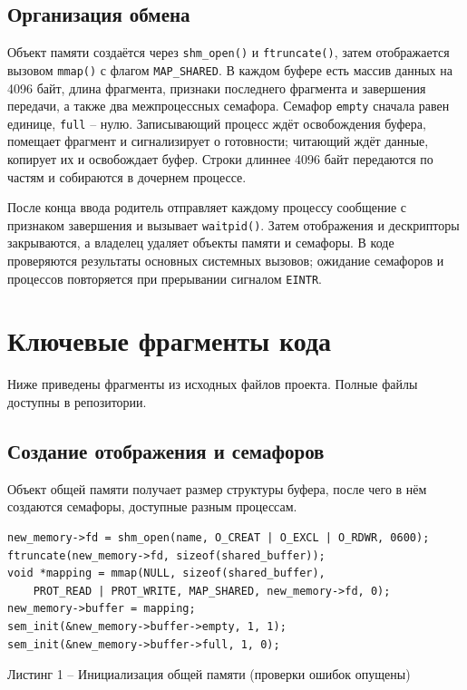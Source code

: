 \documentclass[12pt,a4paper]{article}
\begin{document}
\subsection{Организация обмена}
Объект памяти создаётся через \texttt{shm\_open()} и \texttt{ftruncate()}, затем отображается вызовом \texttt{mmap()} с флагом \texttt{MAP\_SHARED}. В каждом буфере есть массив данных на 4096 байт, длина фрагмента, признаки последнего фрагмента и завершения передачи, а также два межпроцессных семафора. Семафор \texttt{empty} сначала равен единице, \texttt{full} -- нулю. Записывающий процесс ждёт освобождения буфера, помещает фрагмент и сигнализирует о готовности; читающий ждёт данные, копирует их и освобождает буфер. Строки длиннее 4096 байт передаются по частям и собираются в дочернем процессе.

После конца ввода родитель отправляет каждому процессу сообщение с признаком завершения и вызывает \texttt{waitpid()}. Затем отображения и дескрипторы закрываются, а владелец удаляет объекты памяти и семафоры. В коде проверяются результаты основных системных вызовов; ожидание семафоров и процессов повторяется при прерывании сигналом \texttt{EINTR}.
\section{Ключевые фрагменты кода}
Ниже приведены фрагменты из исходных файлов проекта. Полные файлы доступны в репозитории.
\clearpage
\subsection{Создание отображения и семафоров}
Объект общей памяти получает размер структуры буфера, после чего в нём создаются семафоры, доступные разным процессам.
\begin{lstlisting}
new_memory->fd = shm_open(name, O_CREAT | O_EXCL | O_RDWR, 0600);
ftruncate(new_memory->fd, sizeof(shared_buffer));
void *mapping = mmap(NULL, sizeof(shared_buffer),
    PROT_READ | PROT_WRITE, MAP_SHARED, new_memory->fd, 0);
new_memory->buffer = mapping;
sem_init(&new_memory->buffer->empty, 1, 1);
sem_init(&new_memory->buffer->full, 1, 0);
\end{lstlisting}
\begin{center}\small Листинг 1 -- Инициализация общей памяти (проверки ошибок опущены)\end{center}
\end{document}
